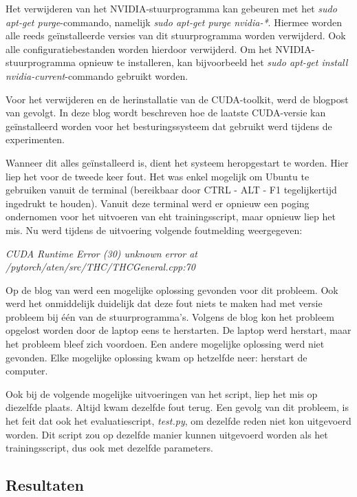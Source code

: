 Het verwijderen van het NVIDIA-stuurprogramma kan gebeuren met het \textit{sudo apt-get purge}-commando, namelijk \textit{sudo apt-get purge nvidia-*}. Hiermee worden alle reeds geïnstalleerde versies van dit stuurprogramma worden verwijderd. Ook alle configuratiebestanden worden hierdoor verwijderd. Om het NVIDIA-stuurprogramma opnieuw te installeren, kan bijvoorbeeld het \textit{sudo apt-get install nvidia-current}-commando gebruikt worden.

Voor het verwijderen en de herinstallatie van de CUDA-toolkit, werd de blogpost van \textcite{cudainstall} gevolgt. In deze blog wordt beschreven hoe de laatste CUDA-versie kan geïnstalleerd worden voor het besturingssysteem dat gebruikt werd tijdens de experimenten.

Wanneer dit alles geïnstalleerd is, dient het systeem heropgestart te worden. Hier liep het voor de tweede keer fout. Het was enkel mogelijk om Ubuntu te gebruiken vanuit de terminal (bereikbaar door CTRL - ALT - F1 tegelijkertijd ingedrukt te houden). Vanuit deze terminal werd er opnieuw een poging ondernomen voor het uitvoeren van eht trainingsscript, maar opnieuw liep het mis. Nu werd tijdens de uitvoering volgende foutmelding weergegeven:

\begin{center}
	\textit{CUDA Runtime Error (30) unknown error at /pytorch/aten/src/THC/THCGeneral.cpp:70}
\end{center}

Op de blog van \textcite{cudablog} werd een mogelijke oplossing gevonden voor dit probleem. Ook werd het onmiddelijk duidelijk dat deze fout niets te maken had met versie probleem bij één van de stuurprogramma's. Volgens de blog kon het probleem opgelost worden door de laptop eens te herstarten. De laptop werd herstart, maar het probleem bleef zich voordoen. Een andere mogelijke oplossing werd niet gevonden. Elke mogelijke oplossing kwam op hetzelfde neer: herstart de computer.

Ook bij de volgende mogelijke uitvoeringen van het script, liep het mis op diezelfde plaats. Altijd kwam dezelfde fout terug. Een gevolg van dit probleem, is het feit dat ook het evaluatiescript, \textit{test.py}, om dezelfde reden niet kon uitgevoerd worden. Dit script zou op dezelfde manier kunnen uitgevoerd worden als het trainingsscript, dus ook met dezelfde parameters.

\subsection{Resultaten}

